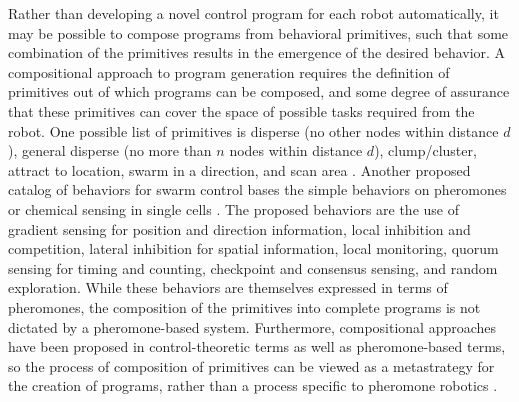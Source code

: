 Rather than developing a novel control program for each robot automatically, it may be possible to compose programs from behavioral primitives, such that some combination of the primitives results in the emergence of the desired behavior. 
A compositional approach to program generation requires the definition of primitives out of which programs can be composed, and some degree of assurance that these primitives can cover the space of possible tasks required from the robot. 
One possible list of primitives is disperse (no other nodes within distance $d$), general disperse (no more than $n$ nodes within distance $d$), clump/cluster, attract to location, swarm in a direction, and scan area \citep{evans2000programming}.
Another proposed catalog of behaviors for swarm control bases the simple behaviors on pheromones or chemical sensing in single cells \citep{nagpal2004catalog}. 
The proposed behaviors are the use of gradient sensing for position and direction information, local inhibition and competition, lateral inhibition for spatial information, local monitoring, quorum sensing for timing and counting, checkpoint and consensus sensing, and random exploration. 
While these behaviors are themselves expressed in terms of pheromones, the composition of the primitives into complete programs is not dictated by a pheromone-based system.
Furthermore, compositional approaches have been proposed in control-theoretic terms as well as pheromone-based terms, so the process of composition of primitives can be viewed as a metastrategy for the creation of programs, rather than a process specific to pheromone robotics \citep{belta2007symbolic}.



